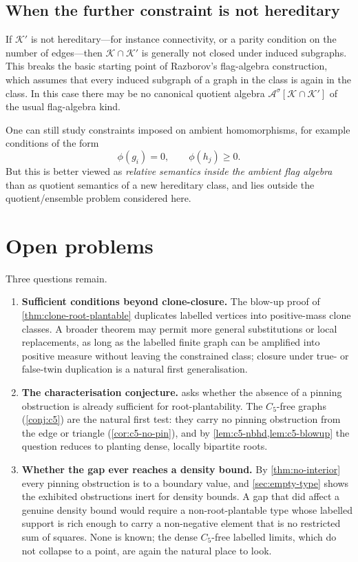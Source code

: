 \documentclass[11pt]{article}
\theoremstyle{definition}
\newcommand{\A}{\mathcal{A}}
\newcommand{\K}{\mathcal{K}}
\begin{document}
\subsection{When the further constraint is not hereditary}

If $\K'$ is not hereditary---for instance connectivity, or a parity condition on the
number of edges---then $\K\cap\K'$ is generally not closed under induced subgraphs.  This
breaks the basic starting point of Razborov's flag-algebra construction, which assumes
that every induced subgraph of a graph in the class is again in the class.  In this case
there may be no canonical quotient algebra $\A^\sigma[\K\cap\K']$ of the usual
flag-algebra kind.

One can still study constraints imposed on ambient homomorphisms, for example
conditions of the form
\[
  \phi(g_i)=0,
  \qquad
  \phi(h_j)\ge0.
\]
But this is better viewed as \emph{relative semantics inside the ambient flag
algebra} than as quotient semantics of a new hereditary class, and lies outside the
quotient/ensemble problem considered here.

\section{Open problems}

Three questions remain.

\begin{enumerate}[label=\textup{(\arabic*)}, leftmargin=2.8em]
  \item \textbf{Sufficient conditions beyond clone-closure.}
  The blow-up proof of \cref{thm:clone-root-plantable} duplicates labelled vertices into
  positive-mass clone classes.  A broader theorem may permit more general substitutions
  or local replacements, as long as the labelled finite graph can be amplified into
  positive measure without leaving the constrained class; closure under true- or
  false-twin duplication is a natural first generalisation.

  \item \textbf{The characterisation conjecture.}
   asks whether the absence of a pinning obstruction is
  already sufficient for root-plantability.  The $C_5$-free graphs (\cref{conj:c5}) are
  the natural first test: they carry no pinning obstruction from the edge or triangle
  (\cref{cor:c5-no-pin}), and by \cref{lem:c5-nbhd,lem:c5-blowup} the question reduces to
  planting dense, locally bipartite roots.

  \item \textbf{Whether the gap ever reaches a density bound.}
  By \cref{thm:no-interior} every pinning obstruction is to a boundary value, and
  \cref{sec:empty-type} shows the exhibited obstructions inert for density bounds.  A gap
  that did affect a genuine density bound would require a non-root-plantable type whose
  labelled support is rich enough to carry a non-negative element that is no restricted sum
  of squares.  None is known; the dense $C_5$-free labelled limits, which do not collapse to a
  point, are again the natural place to look.
\end{enumerate}
\end{document}
